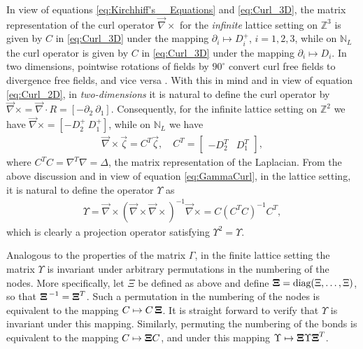 \documentclass{cmslatex}
\newcommand\bXi{\mbox{\boldmath${\Xi}$}}
\begin{document}
In view of equations \eqref{eq:Kirchhiff's__Equations} and
\eqref{eq:Curl_3D}, the matrix representation of the curl operator
$\vec{\nabla}\times$ for the \emph{infinite} lattice setting on $\mathbb{Z}^3$
is given by $C$ in \eqref{eq:Curl_3D} under the mapping $\partial_i\mapsto D^+_i$,
$i=1,2,3$, while on $\mathbb{N}_L$ the curl operator is given by
$C$ in \eqref{eq:Curl_3D} under the mapping $\partial_i\mapsto D_i$. In two
dimensions, pointwise rotations of fields by $90^\circ$ convert curl free
fields to divergence free fields, and vice versa
\cite{MILTON:2002:TC}. With this in mind and in view of equation
\eqref{eq:Curl_2D}, in \emph{two-dimensions} it is natural to define
the curl operator by $\vec{\nabla}\times=\vec{\nabla}\cdot R=[ - \partial_2 \
\partial_1]$. Consequently, for the infinite lattice setting on
$\mathbb{Z}^2$ we have $\vec{\nabla}\times=[ - D^+_2 \ D^+_1]$, while on
$\mathbb{N}_L$ we have  
%
\begin{align}
  \vec{\nabla}\times\vec{\zeta}=C^T\vec{\zeta}, \quad
  C^T=
  \left[
    \begin{array}{ccc}
       -D_2^T  &   D_1^T
    \end{array}
  \right],
\end{align}
%
where $C^TC=\nabla^T\nabla=\Delta$, the matrix representation of the Laplacian. From
the above discussion and in view of equation \eqref{eq:GammaCurl}, in
the lattice setting, it is natural to define the operator $\Upsilon$ as
%
\begin{align}\label{eq:GammaCurl_NL}
  \Upsilon=\vec{\nabla}\times(\vec{\nabla}\times\vec{\nabla}\times)^{-1}\vec{\nabla}\times
   =C(C^TC)^{-1}C^T,
\end{align}
%
which is clearly a projection operator satisfying $\Upsilon^2=\Upsilon$.




Analogous
to the properties of the matrix $\Gamma$, in the finite lattice setting the 
matrix $\Upsilon$ is invariant under arbitrary permutations in the numbering
of the nodes. More specifically, let $\Xi$ be defined as above and
define $\bXi=\text{diag}(\Xi,\ldots,\Xi)$, so that $\bXi^{\,-1}=\bXi^T$. Such a
permutation in the 
numbering of the nodes is equivalent to the mapping
$C\mapsto C\,\bXi$. It is straight forward to verify that $\Upsilon$ is invariant
under this mapping. Similarly, permuting the numbering of
the bonds is equivalent to the mapping $C\mapsto \bXi C$, and under
this mapping $\Upsilon\mapsto \bXi \Upsilon {\bXi}^T$.  
\end{document}
